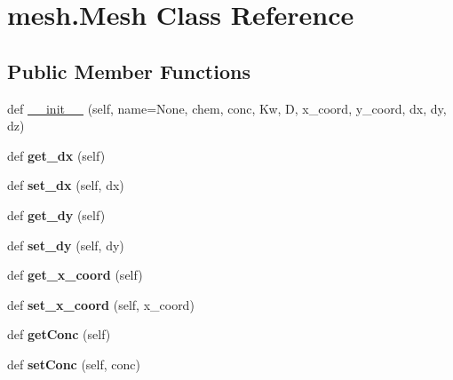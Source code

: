 \hypertarget{classmesh_1_1Mesh}{}\section{mesh.\+Mesh Class Reference}
\label{classmesh_1_1Mesh}
\subsection*{Public Member Functions}
\begin{DoxyCompactItemize}
\item 
def \hyperlink{classmesh_1_1Mesh_a016f17ce91fada2b8c3d3f5b16cce9b4}{\+\_\+\+\_\+init\+\_\+\+\_\+} (self, name=None, chem, conc, Kw, D, x\+\_\+coord, y\+\_\+coord, dx, dy, dz)
\item 
def {\bfseries get\+\_\+dx} (self)\hypertarget{classmesh_1_1Mesh_aac1703ed48d76086e368185b22379f7c}{}\label{classmesh_1_1Mesh_aac1703ed48d76086e368185b22379f7c}

\item 
def {\bfseries set\+\_\+dx} (self, dx)\hypertarget{classmesh_1_1Mesh_ad40facc36923c9b0fcc0d6363ee6107b}{}\label{classmesh_1_1Mesh_ad40facc36923c9b0fcc0d6363ee6107b}

\item 
def {\bfseries get\+\_\+dy} (self)\hypertarget{classmesh_1_1Mesh_aef4bece754687fe2a3ae90e07829913d}{}\label{classmesh_1_1Mesh_aef4bece754687fe2a3ae90e07829913d}

\item 
def {\bfseries set\+\_\+dy} (self, dy)\hypertarget{classmesh_1_1Mesh_a7f1c6bb5694f587777f426da7c316aa3}{}\label{classmesh_1_1Mesh_a7f1c6bb5694f587777f426da7c316aa3}

\item 
def {\bfseries get\+\_\+x\+\_\+coord} (self)\hypertarget{classmesh_1_1Mesh_af4cefc4542a761b56edd215265b8d367}{}\label{classmesh_1_1Mesh_af4cefc4542a761b56edd215265b8d367}

\item 
def {\bfseries set\+\_\+x\+\_\+coord} (self, x\+\_\+coord)\hypertarget{classmesh_1_1Mesh_ac7be9a536451cb577ebf0ce4debc43c1}{}\label{classmesh_1_1Mesh_ac7be9a536451cb577ebf0ce4debc43c1}

\item 
def {\bfseries get\+Conc} (self)\hypertarget{classmesh_1_1Mesh_a0a358fc09db4af0d46d696bb796bca66}{}\label{classmesh_1_1Mesh_a0a358fc09db4af0d46d696bb796bca66}

\item 
def {\bfseries set\+Conc} (self, conc)\hypertarget{classmesh_1_1Mesh_ad5802c6f926a2fe0d7b885c9c687a5da}{}\label{classmesh_1_1Mesh_ad5802c6f926a2fe0d7b885c9c687a5da}


\end{DoxyCompactItemize}

